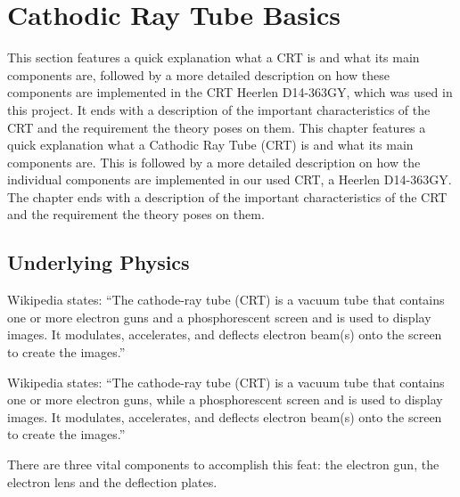 
\chapter{Cathodic Ray Tube Basics}
\label{ch:Cathodic Ray Tube Basics}

This section features a quick explanation what a CRT is and what its main components are, followed by a more detailed description on how these components are implemented in the CRT Heerlen D14-363GY, which was used in this project. It ends with a description of the important characteristics of the CRT and the requirement the theory poses on them.
This chapter features a quick explanation what a Cathodic Ray Tube (CRT) is and what its main components are. This is followed by a more detailed description on how the individual components are implemented in our used CRT, a Heerlen D14-363GY. The chapter ends with a description of the important characteristics of the CRT and the requirement the theory poses on them.

\section{Underlying Physics}

Wikipedia states: ``The cathode-ray tube (CRT) is a vacuum tube that contains one or more electron guns and a phosphorescent screen and is used to display images. It modulates, accelerates, and deflects electron beam(s) onto the screen to create the images.''

Wikipedia states: ``The cathode-ray tube (CRT) is a vacuum tube that contains one or more electron guns, while a phosphorescent screen and is used to display images. It modulates, accelerates, and deflects electron beam(s) onto the screen to create the images.''

There are three vital components to accomplish this feat: the electron gun, the electron lens and the deflection plates.


